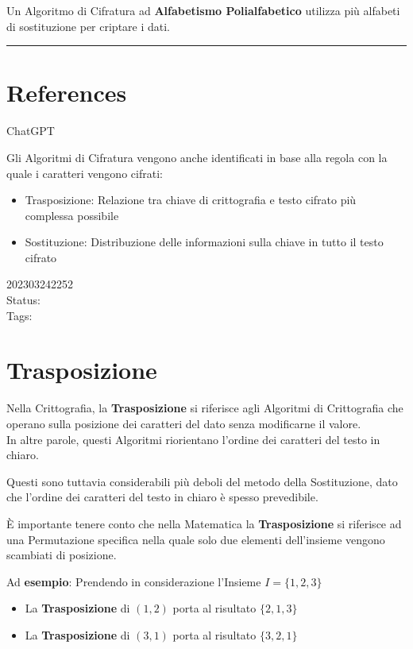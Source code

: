 \documentclass[
]{article}
\providecommand{\tightlist}{%
  \setlength{\itemsep}{0pt}\setlength{\parskip}{0pt}}
\begin{document}
Un Algoritmo di Cifratura ad \textbf{Alfabetismo Polialfabetico}
utilizza più alfabeti di sostituzione per criptare i dati.

\begin{center}\rule{0.5\linewidth}{0.5pt}\end{center}

\hypertarget{references-4}{%
\section{References}\label{references-4}}

ChatGPT

Gli Algoritmi di Cifratura vengono anche identificati in base alla
regola con la quale i caratteri vengono cifrati:

\begin{itemize}
\tightlist
\item
  Trasposizione: Relazione tra chiave di crittografia e testo cifrato
  più complessa possibile
\item
  Sostituzione: Distribuzione delle informazioni sulla chiave in tutto
  il testo cifrato
\end{itemize}

202303242252\\
Status:\\
Tags:

\hypertarget{trasposizione}{%
\section{Trasposizione}\label{trasposizione}}

Nella Crittografia, la \textbf{Trasposizione} si riferisce agli
Algoritmi di Crittografia che operano sulla posizione dei caratteri del
dato senza modificarne il valore.\\
In altre parole, questi Algoritmi riorientano l'ordine dei caratteri del
testo in chiaro.

Questi sono tuttavia considerabili più deboli del metodo della
Sostituzione, dato che l'ordine dei caratteri del testo in chiaro è
spesso prevedibile.

È importante tenere conto che nella Matematica la \textbf{Trasposizione}
si riferisce ad una Permutazione specifica nella quale solo due elementi
dell'insieme vengono scambiati di posizione.

Ad \textbf{esempio}: Prendendo in considerazione l'Insieme
{\(I = \{ 1,2,3\}\)}

\begin{itemize}
\tightlist
\item
  La \textbf{Trasposizione} di {\((1,2)\)} porta al risultato
  {\(\{ 2,1,3\}\)}
\item
  La \textbf{Trasposizione} di {\((3,1)\)} porta al risultato
  {\(\{ 3,2,1\}\)}
\end{itemize}
\end{document}
